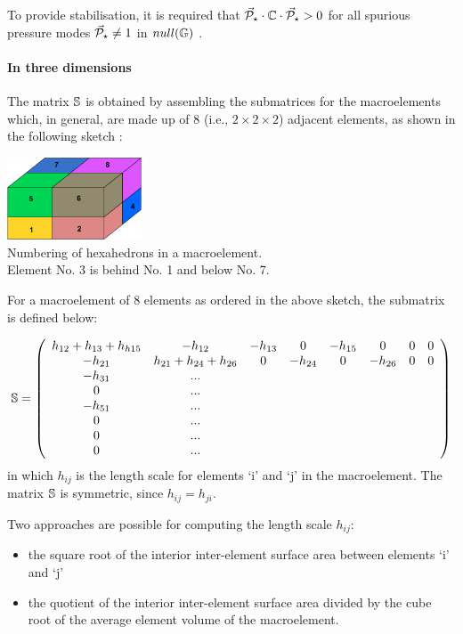 To provide stabilisation, it is required that
$\vec{\cal P}_\star \cdot {\mathbb{C}} \cdot \vec{\cal P}_\star > 0$ for all
spurious pressure modes $\vec{\cal P}_\star \neq 1$ in $null({\mathbb{G}})$ \cite[p239]{elsw}.


\paragraph{In three dimensions}


The matrix ${\mathbb{S}}$ is obtained by assembling the submatrices 
for the macroelements which, in general, are made up of 8 (i.e., $2\times 2 \times 2$) 
adjacent elements, as shown in the following sketch \cite{chsu97}:

\begin{center}
\includegraphics[width=4cm]{images/q1p0stab/macro3D}\\
{\captionfont Numbering of hexahedrons in a macroelement.\\ 
Element No. 3 is behind No. 1 and below No. 7.} 
\end{center}

For a macroelement of 8 elements as ordered in the above sketch, the submatrix is defined below:

\[
{\mathbb{S}}=
\left(
\begin{array}{cccccccc}
h_{12}+h_{13}+h_{h15} & -h_{12} & -h_{13} &  0  &  -h_{15} & 0  & 0 & 0 \\
-h_{21} & h_{21}+h_{24} + h_{26} & 0 & -h_{24} & 0 & -h_{26} & 0 & 0 \\
-h_{31} & ... \\
0 & ... \\
-h_{51} & ...\\
0 & ...\\
0 & ...\\
0 & ...
\end{array}
\right)
\]
in which $h_{ij}$ is the length scale for elements `i' and `j' in the macroelement. 
The matrix ${\mathbb{S}}$ is symmetric, since $h_{ij}=h_{ji}$. 

Two approaches are possible  for computing the length scale $h_{ij}$:
\begin{itemize}
\item the square root of the interior inter-element surface area between elements `i' and `j'
\item the quotient of the interior inter-element surface area divided by the cube 
root of the average element volume of the macroelement.
\end{itemize}


